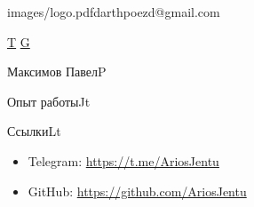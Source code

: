 \documentclass[10pt]{extarticle}
\begin{document}
	
	\init

	\begin{sidebar}{images/logo.pdf}{darthpoezd@gmail.com}

		\hfill
		{
			\iconsfont\fontsize{20}{18}\selectfont
			\href{https://t.me/AriosJentu}{T}
			\href{https://github.com/AriosJentu}{G}
		}








	\end{sidebar}

	\begin{centralpart}{Максимов Павел}{P}{}
		
		\aboutprog
	
	\end{centralpart}

	\UpdatePosition
	
	\begin{centralpart}{Опыт работы}{J}{t}

		\weteacher

		\wefecrc

	\end{centralpart}

	\BottomSignature

	\NewPage
	\ApplyNoSideBar
	\DrawSimpleSideBar

	\begin{centralpart}{}{}{}

		\wesoftwaretd
		
	\end{centralpart}

	\UpdatePosition

	\CentralProjects

	\BottomSignature
	\NewPage
	\DrawSimpleSideBar

	\CentralContributions

	\UpdatePosition
	\CentralEducation

	\UpdatePosition
	\begin{centralpart}{Ссылки}{L}{t}
		\begin{titleblock}{}{}{}{}
			\vspace*{-25pt}
			\begin{itemize}[label=$\circ$]
				\item Telegram: {\color{sidetopsep}\href{https://t.me/AriosJentu}{https://t.me/AriosJentu}} \vp
				\item GitHub: {\color{sidetopsep}\href{https://github.com/AriosJentu}{https://github.com/AriosJentu}} \vp
			\end{itemize}
		\end{titleblock}
	\end{centralpart}

	\BottomSignature
\end{document}
